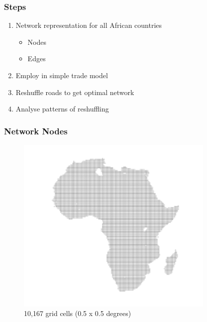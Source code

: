 \documentclass[]{beamer}   	%
\begin{document}
\begin{frame}
  \frametitle{Steps}
  \begin{enumerate}
    \item \alert{Network representation for all African countries}
    \begin{itemize}
      \item \alert{Nodes}
      \item Edges
    \end{itemize}
    \item Employ in simple trade model
    \item Reshuffle roads to get optimal network
    \item Analyse patterns of reshuffling
  \end{enumerate}
\end{frame}

\begin{frame}
  \frametitle{Network Nodes}
  \begin{figure}
    \includegraphics[width=0.85\textwidth, trim={1cm 4cm 0cm 2cm},clip]{../../Write/Present/Images/African_grid.png}
    \caption{10,167 grid cells (0.5 x 0.5 degrees)}
  \end{figure}
\end{frame}
\end{document}
